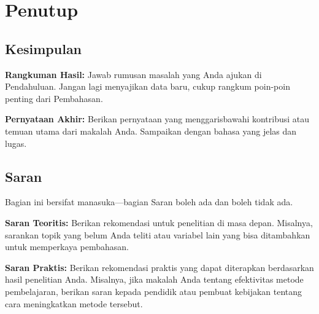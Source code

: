 \chapter{Penutup}


\section{Kesimpulan}

\textbf{Rangkuman Hasil:} Jawab rumusan masalah yang Anda ajukan di Pendahuluan. Jangan lagi menyajikan data baru, cukup rangkum poin-poin penting dari Pembahasan.

\textbf{Pernyataan Akhir:} Berikan pernyataan yang menggarisbawahi kontribusi atau temuan utama dari makalah Anda. Sampaikan dengan bahasa yang jelas dan lugas.

\section{Saran}

Bagian ini bersifat manasuka---bagian Saran boleh ada dan boleh tidak ada.

\textbf{Saran Teoritis:} Berikan rekomendasi untuk penelitian di masa depan. Misalnya, sarankan topik yang belum Anda teliti atau variabel lain yang bisa ditambahkan untuk memperkaya pembahasan.

\textbf{Saran Praktis:} Berikan rekomendasi praktis yang dapat diterapkan berdasarkan hasil penelitian Anda. Misalnya, jika makalah Anda tentang efektivitas metode pembelajaran, berikan saran kepada pendidik atau pembuat kebijakan tentang cara meningkatkan metode tersebut.